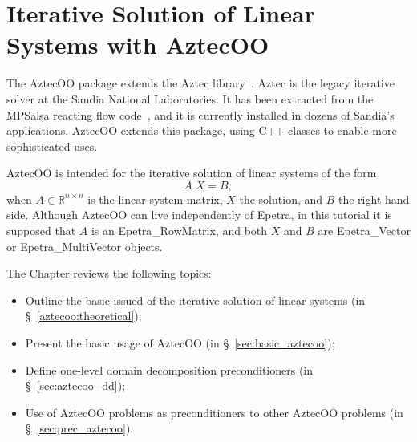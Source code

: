 % 
% 
% 
%  
%  
% 

\section{Iterative Solution of Linear Systems with AztecOO}
\label{chap:aztecoo}

The AztecOO \cite{AztecOO-Users-Guide} package extends the Aztec library~\cite{Aztec2.1}.
Aztec is the legacy iterative solver at the Sandia National
Laboratories.  It has been extracted from the MPSalsa reacting flow
code~\cite{MPSalsa-Theory,MPSalsa-User-Guide}, and it is currently
installed in dozens of Sandia's applications. AztecOO extends this
package, using C++ classes to enable more sophisticated uses.

AztecOO is intended for the iterative solution of linear systems of the form
\begin{equation}
  \label{eq:linear_sys}
  A \; X = B ,
\end{equation}
when $A \in \mathbb{R}^{n \times n}$ is the linear system matrix, $X$
the solution, and $B$ the right-hand side. Although AztecOO can live
independently of Epetra, in this tutorial it is supposed that $A$ is an
Epetra\_RowMatrix, and both $X$ and $B$ are Epetra\_Vector or
Epetra\_MultiVector objects.

The Chapter reviews the following topics:
\begin{itemize}
\item Outline the basic issued of the iterative solution of linear
  systems (in \S~\ref{aztecoo:theoretical});
\item Present the basic usage of AztecOO (in
  \S~\ref{sec:basic_aztecoo});
\item Define one-level domain decomposition preconditioners (in
  \S~\ref{sec:aztecoo_dd});
\item Use of AztecOO problems as preconditioners to other AztecOO
  problems (in \S~\ref{sec:prec_aztecoo}).
\end{itemize}

